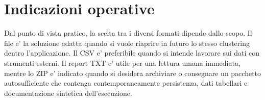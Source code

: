 \section{Indicazioni operative}

Dal punto di vista pratico, la scelta tra i diversi formati dipende dallo scopo. Il file
 e' la soluzione adatta quando si vuole riaprire in futuro lo stesso
clustering dentro l'applicazione. Il CSV e' preferibile quando si intende lavorare sui
dati con strumenti esterni. Il report TXT e' utile per una lettura umana immediata,
mentre lo ZIP e' indicato quando si desidera archiviare o consegnare un pacchetto
autosufficiente che contenga contemporaneamente persistenza, dati tabellari e
documentazione sintetica dell'esecuzione.
